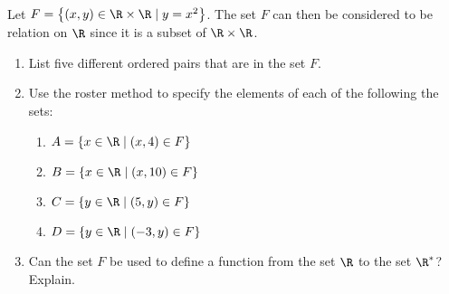 \begin{prog}\label{prog:setofpairs} \hfill \\
Let $F = \left\{ (x, y) \in \R \times \R \mid y = x^2 \right\}$.  The set $F$ can then be considered to be relation on $\R$ since it is a subset of $\R \times \R$.

\begin{enumerate}
\item List five different ordered pairs that are in the set $F$.

\item Use the roster method to specify the elements of each of the following the sets:
\begin{multicols}{2}
\begin{enumerate}
\item $A = \left\{ x \in \R \mid (x, 4) \in F \right\}$
\item $B = \left\{ x \in \R \mid (x, 10) \in F \right\}$
\item $C = \left\{ y \in \R \mid (5, y) \in F \right\}$
\item $D = \left\{ y \in \R \mid (-3, y) \in F \right\}$
\end{enumerate}
\end{multicols}

\item Can the set  $F$  be used to define a function from the set  $\R$  to the set  $\R^*$?  Explain.
\end{enumerate}
\end{prog}

\endinput
